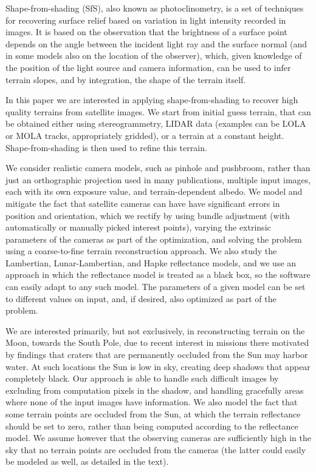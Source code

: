 \documentclass[12pt,oneside]{article}
\begin{document}
Shape-from-shading (SfS), also known as photoclinometry, is a set of
techniques for recovering surface relief based on variation in light
intensity recorded in images. It is based on the observation that the
brightness of a surface point depends on the angle between the incident
light ray and the surface normal (and in some models also on the
location of the observer), which, given knowledge of the position of the
light source and camera information, can be used to infer terrain slopes,
and by integration, the shape of the terrain itself.

In this paper we are interested in applying shape-from-shading to
recover high quality terrains from satellite images. We start from
initial guess terrain, that can be obtained either using
stereogrammetry, LIDAR data (examples can be LOLA or MOLA tracks,
appropriately gridded), or a terrain at a constant height. Shape-from-shading
is then used to refine this terrain.

We consider realistic camera models, such as pinhole and pushbroom,
rather than just an orthographic projection used in many publications,
multiple input images, each with its own exposure value, and
terrain-dependent albedo. We model and mitigate the fact that satellite
cameras can have have significant errors in position and orientation,
which we rectify by using bundle adjustment (with automatically
or manually picked interest points), varying the extrinsic parameters of
the cameras as part of the optimization, and solving the problem using
a coarse-to-fine terrain reconstruction approach.  We also study the
Lambertian, Lunar-Lambertian, and Hapke reflectance models, and we use
an approach in which the reflectance model is treated as a black box, so
the software can easily adapt to any such model. The parameters of a given model
can be set to different values on input, and, if desired, also optimized
as part of the problem. 

We are interested primarily, but not exclusively, in reconstructing
terrain on the Moon, towards the South Pole, due to recent interest in missions
there motivated by findings that craters that are permanently occluded
from the Sun may harbor water. At such locations the Sun is low in
sky, creating deep shadows that appear completely black. Our approach is
able to handle such difficult images by excluding from computation
pixels in the shadow, and handling gracefully areas where none of the
input images have information. We also model the fact that some terrain points are
occluded from the Sun, at which the terrain reflectance should be set to zero,
rather than being computed according to the reflectance model. We assume however that
the observing cameras are sufficiently high in the sky that no terrain
points are occluded from the cameras (the latter could easily be modeled
as well, as detailed in the text).
\end{document}
